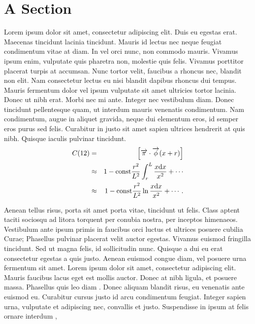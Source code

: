 \section{A Section}

Lorem ipsum dolor sit amet, consectetur adipiscing elit. Duis eu egestas erat. Maecenas tincidunt lacinia tincidunt. Mauris id lectus nec neque feugiat condimentum vitae at diam. In vel orci nunc, non commodo mauris. Vivamus ipsum enim, vulputate quis pharetra non, molestie quis felis. Vivamus porttitor placerat turpis at accumsan. Nunc tortor velit, faucibus a rhoncus nec, blandit non elit. Nam consectetur lectus eu nisi blandit dapibus rhoncus dui tempus. Mauris fermentum dolor vel ipsum vulputate sit amet ultricies tortor lacinia. Donec ut nibh erat. Morbi nec mi ante. Integer nec vestibulum diam. Donec tincidunt pellentesque quam, ut interdum mauris venenatis condimentum. Nam condimentum, augue in aliquet gravida, neque dui elementum eros, id semper eros purus sed felis. Curabitur in justo sit amet sapien ultrices hendrerit at quis nibh. Quisque iaculis pulvinar tincidunt. 
\begin{eqnarray}
C(12) &= &\left[\overrightarrow{\pi}\cdot\overrightarrow{\phi}(x+r)\right] \nonumber \\ 
&\approx& 1-\mathrm{const}\frac{r^2}{L^2}\int_r^L\frac{x\mathrm{d} x}{x^2} + \cdots \nonumber  \\
&\approx& 1-\mathrm{const}\frac{r^2}{L^2}\ln\frac{x\mathrm{d} x}{x^2} + \cdots .\label{brokenlongeqn}
\end{eqnarray}

Aenean tellus risus, porta sit amet porta vitae, tincidunt ut felis. Class aptent taciti sociosqu ad litora torquent per conubia nostra, per inceptos himenaeos. Vestibulum ante ipsum primis in faucibus orci luctus et ultrices posuere cubilia Curae; Phasellus pulvinar placerat velit auctor egestas. Vivamus euismod fringilla tincidunt. Sed ut magna felis, id sollicitudin nunc. Quisque a dui eu erat consectetur egestas a quis justo. Aenean euismod congue diam, vel posuere urna fermentum sit amet. Lorem ipsum dolor sit amet, consectetur adipiscing elit. Mauris faucibus lacus eget est mollis auctor. Donec at nibh ligula, et posuere massa. Phasellus quis leo diam \cite{diamantaras1996pcn}.
Donec aliquam blandit risus, eu venenatis ante euismod eu. Curabitur cursus justo id arcu condimentum feugiat. Integer sapien urna, vulputate et adipiscing nec, convallis et justo. Suspendisse in ipsum at felis ornare interdum \cite{tulone2006pts},

